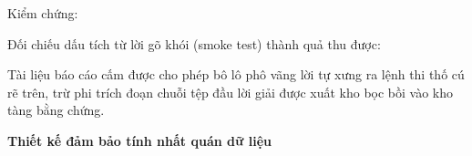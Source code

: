Kiểm chứng:

\begin{Shaded}
\begin{Highlighting}[]
\DataTypeTok{\textbackslash{}}
  \DataTypeTok{\textbackslash{}}
\end{Highlighting}
\end{Shaded}

Đối chiếu dấu tích từ lời gõ khói (smoke test) thành quả thu được:

\begin{Shaded}
\begin{Highlighting}[]
\DataTypeTok{\textbackslash{}}
  \DataTypeTok{\textbackslash{}}
    \DataTypeTok{\textbackslash{}}
\end{Highlighting}
\end{Shaded}

Tài liệu báo cáo cấm được cho phép bô lô phô vãng lời tự xưng ra lệnh
thi thố cú rẽ trên, trừ phi trích đoạn chuỗi tệp đầu lời giải được xuất
kho bọc bồi vào kho tàng bằng chứng.

\vspace{0.5em}\noindent\textbf{Thiết kế đảm bảo tính nhất quán dữ
liệu}\par

